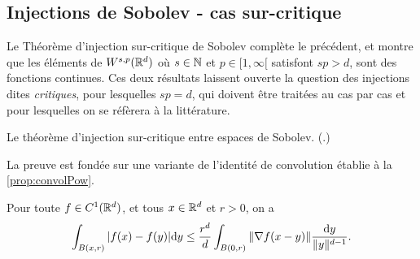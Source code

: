 \subsection{Injections de Sobolev - cas sur-critique}
\label{subsec:injSurCrit}

Le Théorème d'injection sur-critique de Sobolev complète le précédent, et montre que les éléments de $W^{s,p}(\mathbb{R}^d)$ où $s\in \mathbb{N}$ et $p \in [1,\infty[$ satisfont $s p>d$, sont des fonctions continues.
Ces deux résultats laissent ouverte la question des injections dites \emph{critiques}, pour lesquelles  $s p = d$, qui doivent être traitées au cas par cas et pour lesquelles on se réfèrera à la littérature. 

\begin{retenir}
	Le théorème d'injection sur-critique entre espaces de Sobolev.
	(.)
\end{retenir}

La preuve est fondée sur une variante de l'identité de convolution établie à la \cref{prop:convolPow}.
\begin{proposition}
\label{prop:convolPow2}
%
Pour toute $f \in C^1(\mathbb{R}^d)$, et tous $x \in \mathbb{R}^d$ et $r>0$, on a 
\begin{equation*}
	\int_{B(x,r)} |f(x) -  f(y)| \mathrm{d} y \leq \frac{r^d}{d}\int_{B(0,r)} \|\nabla f(x-y)\| \frac{\mathrm{d} y}{\|y\|^{d-1}}.
\end{equation*}
\end{proposition}

